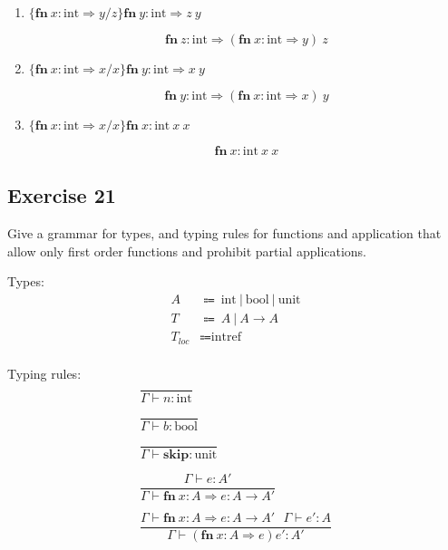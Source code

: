 \documentclass[10pt,\jkfside,a4paper]{article}
\begin{document}
\begin{enumerate}

\item $\{\textbf{fn} \ x: \text{int} \Rightarrow y / z\}\textbf{fn} \
y:\text{int} \Rightarrow z \ y$

\[
\textbf{fn} \ z:\text{int} \Rightarrow (\textbf{fn} \ x: \text{int}
\Rightarrow y) \ z
\]

\item $\{\textbf{fn} \ x: \text{int} \Rightarrow x / x\}\textbf{fn} \
y:\text{int} \Rightarrow x \ y$

\[
\textbf{fn} \ y:\text{int} \Rightarrow (\textbf{fn} \ x: \text{int}
\Rightarrow x) \ y
\]

\item $\{\textbf{fn} \ x:\text{int} \Rightarrow x / x\}\textbf{fn} \
x:\text{int} \ x \ x$

\[
\textbf{fn} \ x:\text{int} \ x \ x
\]

\end{enumerate}

\subsection*{Exercise 21}

Give a grammar for types, and typing rules for functions and application
that allow only first order functions and prohibit partial applications.

Types:
\begin{align*}
A &\Coloneqq \ \text{int} \ | \ \text{bool} \ | \ \text{unit} \\
T &\Coloneqq \ A \ | \ A \rightarrow A \\
T_{loc} &\Coloneqq \text{intref} \\
\end{align*}

Typing rules:
\begin{gather*}
\dfrac{}{\Gamma \vdash n: \text{int}} \\\\
\dfrac{}{\Gamma \vdash b: \text{bool}} \\\\
\dfrac{}{\Gamma \vdash \textbf{skip}: \text{unit}} \\\\
\dfrac{
\Gamma \vdash e: A'
}{
\Gamma \vdash \textbf{fn} \ x:A \Rightarrow e: A \rightarrow A'
}\\\\
\dfrac{
\Gamma \vdash \textbf{fn} \ x:A \Rightarrow e: A \rightarrow A'
\ \ \
\Gamma \vdash e': A
}{
\Gamma \vdash (\textbf{fn} \ x:A \Rightarrow e)e': A'
}
\end{gather*}
\end{document}

